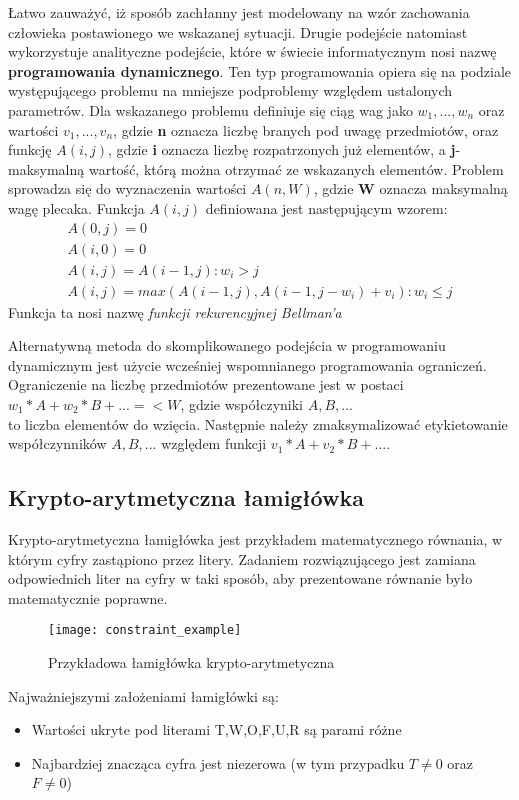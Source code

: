     Łatwo zauważyć, iż sposób zachłanny jest modelowany na wzór zachowania człowieka postawionego we wskazanej sytuacji. Drugie podejście natomiast 
    wykorzystuje analityczne podejście, które w świecie informatycznym nosi nazwę \textbf{programowania dynamicznego}. Ten typ programowania 
    opiera się na podziale występującego problemu na mniejsze podproblemy względem ustalonych parametrów. Dla wskazanego problemu 
    definiuje się ciąg wag jako $w_{1},...,w_{n}$ oraz wartości $v_{1},...,v_{n}$, gdzie \textbf{n} oznacza liczbę branych pod uwagę przedmiotów, 
    oraz funkcję $A(i,j)$, gdzie \textbf{i} oznacza liczbę rozpatrzonych już elementów, a \textbf{j}- maksymalną wartość, którą można otrzymać ze wskazanych 
    elementów. Problem sprowadza się do wyznaczenia wartości $A(n,W)$, gdzie \textbf{W} oznacza maksymalną wagę plecaka.
    Funkcja $A(i,j)$ definiowana jest następującym wzorem:
    \begin{gather}
        \nonumber A(0,j) = 0 \\
        \nonumber A(i,0) = 0 \\
        \nonumber A(i,j) = A(i-1,j) : w_{i} > j\\
        A(i,j) = max(A(i-1,j), A(i-1,j-w_{i}) + v_{i}) : w_{i} \leq j
    \end{gather}
    Funkcja ta nosi nazwę \textit{funkcji rekurencyjnej Bellman'a}


    Alternatywną metoda do skomplikowanego podejścia w programowaniu dynamicznym jest użycie wcześniej wspomnianego programowania ograniczeń.
    Ograniczenie na liczbę przedmiotów prezentowane jest w postaci $w_{1}*A + w_{2}*B + ... =< W$, gdzie współczyniki $A,B,...$ \\
    to liczba elementów do wzięcia.
    Następnie należy zmaksymalizować etykietowanie współczynników $A,B,...$ względem funkcji $v_{1} * A + v_{2} * B + ...$.


    \subsection{Krypto-arytmetyczna łamigłówka}
    Krypto-arytmetyczna łamigłówka jest przykładem matematycznego równania, w którym cyfry zastąpiono przez litery. Zadaniem rozwiązującego 
    jest zamiana odpowiednich liter na cyfry w taki sposób, aby prezentowane równanie było matematycznie poprawne.
    \begin{example}
        \begin{figure}[H]
            \texttt{[image: constraint\_example]}
            \centering
            \caption{Przykładowa łamigłówka krypto-arytmetyczna \cite{AI}}
        \end{figure} 
    \end{example}
    Najważniejszymi założeniami łamigłówki są:
    \begin{itemize}
        \item Wartości ukryte pod literami T,W,O,F,U,R są parami różne
        \item Najbardziej znacząca cyfra jest niezerowa (w tym przypadku $T \neq 0 $ oraz $F \neq 0$)
    \end{itemize}

